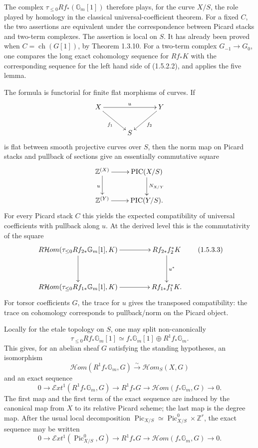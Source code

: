 \documentclass[12pt]{article}
\newcommand{\Zz}{\mathbb Z}
\begin{document}
The complex \(\tau_{\leq0}Rf_*(\mathbb G_m[1])\) therefore plays, for the curve \(X/S\), the role played by homology in the classical universal-coefficient theorem. For a fixed \(C\), the two assertions are equivalent under the correspondence between Picard stacks and two-term complexes. The assertion is local on \(S\). It has already been proved when \(C=\operatorname{ch}(G[1])\), by Theorem 1.3.10. For a two-term complex \(G_{-1}\to G_0\), one compares the long exact cohomology sequence for \(Rf_*K\) with the corresponding sequence for the left hand side of (1.5.2.2), and applies the five lemma.

The formula is functorial for finite flat morphisms of curves. If
\[
\xymatrix@C=1.1cm{
X\ar[rr]^u\ar[rd]_{f_1}&&Y\ar[ld]^{f_2}\\
&S&
}
\]
is flat between smooth projective curves over \(S\), then the norm map on Picard stacks and pullback of sections give an essentially commutative square
\[
\xymatrix{
\Zz^{(X)}\ar[r]\ar[d]_u&\operatorname{PIC}(X/S)\ar[d]^{N_{X/Y}}\\
\Zz^{(Y)}\ar[r]&\operatorname{PIC}(Y/S).
}
\]
For every Picard stack \(C\) this yields the expected compatibility of universal coefficients with pullback along \(u\). At the derived level this is the commutativity of the square
\[
\xymatrix@C=1.5cm@R=1.3cm{
R\mathcal{H}om(\tau_{\leq0}Rf_{2*}\mathbb G_m[1],K)\ar[r]\ar[d]&Rf_{2*}f_2^*K\ar[d]^{u^*}\\
R\mathcal{H}om(\tau_{\leq0}Rf_{1*}\mathbb G_m[1],K)\ar[r]&Rf_{1*}f_1^*K.
}
\tag{1.5.3.3}
\]
For torsor coefficients \(G\), the trace for \(u\) gives the transposed compatibility: the trace on cohomology corresponds to pullback/norm on the Picard object.

Locally for the etale topology on \(S\), one may split non-canonically
\[
\tau_{\leq0}Rf_*\mathbb G_m[1]
\simeq
f_*\mathbb G_m[1]\oplus R^1f_*\mathbb G_m.
\]
This gives, for an abelian sheaf \(G\) satisfying the standing hypotheses, an isomorphism
\[
\mathcal H om(R^1f_*\mathbb G_m,G)
\xrightarrow{\sim}
\mathcal H om_S(X,G)
\tag{1.5.4.1}
\]
and an exact sequence
\[
0\to \mathcal E xt^1(R^1f_*\mathbb G_m,G)
\to R^1f_*G
\to \mathcal H om(f_*\mathbb G_m,G)
\to0.
\tag{1.5.4.2}
\]
The first map and the first term of the exact sequence are induced by the canonical map from \(X\) to its relative Picard scheme; the last map is the degree map. After the usual local decomposition \(\operatorname{Pic}_{X/S}\simeq\operatorname{Pic}^0_{X/S}\times\Zz^r\), the exact sequence may be written
\[
0\to\mathcal E xt^1(\operatorname{Pic}^0_{X/S},G)
\to R^1f_*G
\to \mathcal H om(f_*\mathbb G_m,G)
\to0.
\tag{1.5.4.3}
\]
\end{document}

